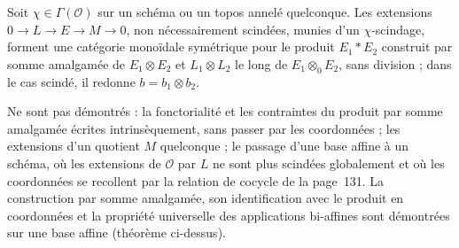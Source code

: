 \begin{enonce}\nonverifie
Soit $\chi \in \Gamma(\mathcal O)$ sur un schéma ou un topos annelé quelconque. Les extensions $0 \to L \to E \to M \to 0$, non nécessairement scindées, munies d'un $\chi$-scindage, forment une catégorie monoïdale symétrique pour le produit $E_1 * E_2$ construit par somme amalgamée de $E_1 \otimes E_2$ et $L_1 \otimes L_2$ le long de $E_1 \otimes_0 E_2$, sans division ; dans le cas scindé, il redonne $b = b_1 \otimes b_2$.
\end{enonce}

\noindent Ne sont pas démontrés : la fonctorialité et les contraintes du produit par somme amalgamée écrites intrinsèquement, sans passer par les coordonnées ; les extensions d'un quotient $M$ quelconque ; le passage d'une base affine à un schéma, où les extensions de $\mathcal O$ par $L$ ne sont plus scindées globalement et où les coordonnées se recollent par la relation de cocycle de la page~131. La construction par somme amalgamée, son identification avec le produit en coordonnées et la propriété universelle des applications bi-affines sont démontrées sur une base affine (théorème ci-dessus).

